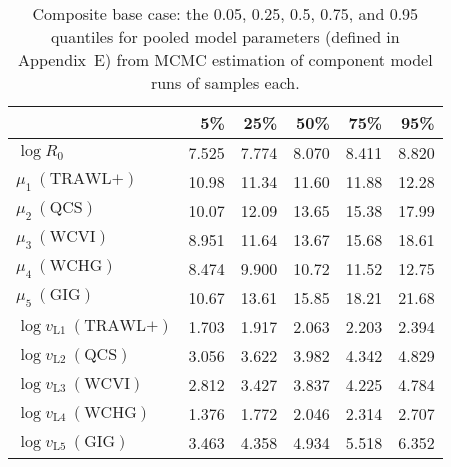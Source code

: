 \documentclass[11pt]{book}
\newcommand{\AppEqn}{Appendix~E}
\begin{document}
\setlength{\tabcolsep}{6pt}
\begin{table}[ht]
\centering
\caption{Composite base case: the 0.05, 0.25, 0.5, 0.75, and 0.95 quantiles for pooled model parameters (defined in \AppEqn) from MCMC estimation of  component model runs of \Nmcmc{} samples each.} 
\label{tab:ymr.base.pars}
\begin{tabular}{lrrrrr}
  \\[-1.0ex] \hline
 & 5\% & 25\% & 50\% & 75\% & 95\% \\ 
  \hline
$\log R_{0}$ & 7.525 & 7.774 & 8.070 & 8.411 & 8.820 \\ 
  $\mu_{1}~(\text{TRAWL+})$ & 10.98 & 11.34 & 11.60 & 11.88 & 12.28 \\ 
  $\mu_{2}~(\text{QCS})$ & 10.07 & 12.09 & 13.65 & 15.38 & 17.99 \\ 
  $\mu_{3}~(\text{WCVI})$ & 8.951 & 11.64 & 13.67 & 15.68 & 18.61 \\ 
  $\mu_{4}~(\text{WCHG})$ & 8.474 & 9.900 & 10.72 & 11.52 & 12.75 \\ 
  $\mu_{5}~(\text{GIG})$ & 10.67 & 13.61 & 15.85 & 18.21 & 21.68 \\ 
  $\log v_{\mathrm{L}1}~(\text{TRAWL+})$ & 1.703 & 1.917 & 2.063 & 2.203 & 2.394 \\ 
  $\log v_{\mathrm{L}2}~(\text{QCS})$ & 3.056 & 3.622 & 3.982 & 4.342 & 4.829 \\ 
  $\log v_{\mathrm{L}3}~(\text{WCVI})$ & 2.812 & 3.427 & 3.837 & 4.225 & 4.784 \\ 
  $\log v_{\mathrm{L}4}~(\text{WCHG})$ & 1.376 & 1.772 & 2.046 & 2.314 & 2.707 \\ 
  $\log v_{\mathrm{L}5}~(\text{GIG})$ & 3.463 & 4.358 & 4.934 & 5.518 & 6.352 \\ 
   \hline
\end{tabular}
\end{table}
\setlength{\tabcolsep}{6pt}
\end{document}
